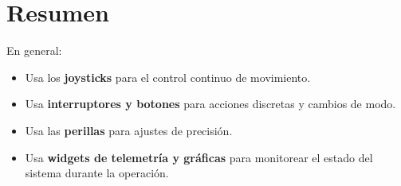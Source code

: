 \section{Resumen}
\label{sec:basic-controls-summary}

En general:
\begin{itemize}
    \item Usa los \textbf{joysticks} para el control continuo de movimiento.
    \item Usa \textbf{interruptores y botones} para acciones discretas y cambios de modo.
    \item Usa las \textbf{perillas} para ajustes de precisión.
    \item Usa \textbf{widgets de telemetría y gráficas} para monitorear el estado del sistema durante la operación.
\end{itemize}